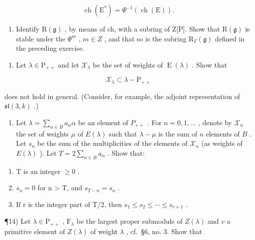\[
\operatorname{ch} \left(\mathrm{E} ^ {*}\right) = \Psi^ {- 1} (\operatorname{ch} (\mathrm{E})).
\]

\begin{enumerate}
\def\labelenumi{\alph{enumi})}
\setcounter{enumi}{3}
\tightlist
\item
  Identify \(\mathrm{R}(\mathfrak{g})\) , by means of ch, with a subring of Z[P]. Show that \(\mathrm{R}(\mathfrak{g})\) is stable under the \(\varPsi^{m}\) , \(m \in Z\) , and that so is the subring \(\mathrm{R}_{\varGamma}(\mathfrak{g})\) defined in the preceding exercise.
\end{enumerate}

\begin{enumerate}
\def\labelenumi{\arabic{enumi})}
\setcounter{enumi}{11}
\tightlist
\item
  Let \(\lambda \in \mathrm{P}_{++}\) and let \(\mathcal{X}_{\lambda}\) be the set of weights of \(\operatorname{E}(\lambda)\) . Show that
\end{enumerate}

\[
\mathcal {X} _ {\lambda} \subset \lambda - \mathrm{P} _ {+ +}
\]

does not hold in general. (Consider, for example, the adjoint representation of \(\mathfrak{sl}(3,k)\) .)

\begin{enumerate}
\def\labelenumi{\arabic{enumi})}
\setcounter{enumi}{12}
\tightlist
\item
  Let \(\lambda = \sum_{\alpha \in B} a_{\alpha} \alpha\) be an element of \(P_{++}\) . For \(n = 0, 1, \ldots\) , denote by \(\mathcal{X}_n\) the set of weights \(\mu\) of \(E(\lambda)\) such that \(\lambda - \mu\) is the sum of \(n\) elements of \(B\) . Let \(s_n\) be the sum of the multiplicities of the elements of \(\mathcal{X}_n\) (as weights of \(E(\lambda)\) ). Let \(T = 2 \sum_{\alpha \in B} a_{\alpha}\) . Show that:
\end{enumerate}

\begin{enumerate}
\def\labelenumi{\alph{enumi})}
\item
  T is an integer \(\geq 0\) .
\item
  \(s_{n}=0\) for n > T, and \(s_{T-n}=s_{n}\) .
\item
  If r is the integer part of T/2, then \(s_{1} \leq s_{2} \leq \cdots \leq s_{r+1}\) .
\end{enumerate}

¶14) Let \(\lambda \in \mathrm{P}_{++}\) , \(\mathrm{F}_{\lambda}\) be the largest proper submodule of \(Z(\lambda)\) and \(v\) a primitive element of \(Z(\lambda)\) of weight \(\lambda\) , cf.~§6, no. 3. Show that

